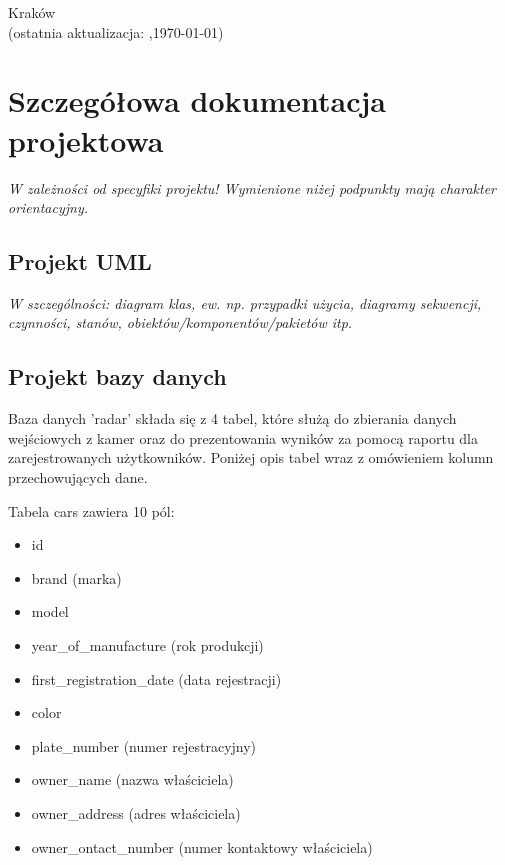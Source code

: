 \documentclass[12pt,a4paper,oneside]{article}
\theoremstyle{definition}
\numberwithin{equation}{section}
\begin{document}
\begin{titlepage}
\vspace*{\fill}
\begin{center}
\large
Kraków \the\year\\
(ostatnia aktualizacja: \DTMcurrenttime,\;\today)
\end{center}
\end{titlepage}
\setcounter{page}{0} 
\newpage\null\thispagestyle{empty}

\tableofcontents


\newpage

\section{Szczegółowa dokumentacja projektowa}
\textit{W zależności od specyfiki projektu! Wymienione niżej podpunkty mają charakter orientacyjny.}
\subsection{Projekt UML}
\textit{W szczególności: diagram klas, ew. np. przypadki użycia, diagramy sekwencji, czynności, stanów, obiektów/komponentów/pakietów itp.}
\subsection{Projekt bazy danych}
Baza danych 'radar' składa się z 4 tabel, które służą do zbierania danych wejściowych z kamer oraz do prezentowania wyników za pomocą raportu dla zarejestrowanych użytkowników. Poniżej opis tabel wraz z omówieniem kolumn przechowujących dane.

    Tabela cars zawiera 10 pól:
    \begin{itemize}
      \item id
      \item brand (marka)
      \item model
      \item year{\_}of{\_}manufacture (rok produkcji)
      \item first{\_}registration{\_}date (data rejestracji)
      \item color 
      \item plate{\_}number (numer rejestracyjny)
      \item owner{\_}name (nazwa właściciela)
      \item owner{\_}address (adres właściciela)
      \item owner{\_}ontact{\_}number (numer kontaktowy właściciela)

   \end{itemize}
        
\end{document}
